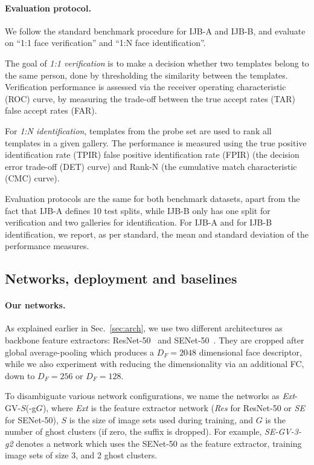 \documentclass[runningheads]{llncs}
\begin{document}
\paragraph{Evaluation protocol.}
We follow the standard benchmark procedure for
IJB-A and IJB-B, and evaluate on
``1:1 face verification'' and ``1:N face identification''.

The goal of \emph{1:1 verification} is to make a decision
whether two templates belong to the same person,
done by thresholding the similarity between the templates.
Verification performance is assessed via the
receiver operating characteristic (ROC) curve,
\ie by measuring the trade-off between the
true accept rates (TAR) \vs false accept 
rates (FAR).

For \emph{1:N identification},
templates from the probe set are used to rank
all templates in a given gallery. 
The performance is 
measured using the true positive identification 
rate (TPIR) \vs false positive identification 
rate (FPIR) (\ie the decision error trade-off (DET) curve)
and \vs Rank-N (\ie the cumulative match characteristic 
(CMC) curve).

Evaluation protocols are the same for both 
benchmark datasets, apart from the fact that
IJB-A defines 10 test splits,
while IJB-B only has one split for verification
and two galleries for identification.
For IJB-A and for IJB-B identification, we report,
as per standard, the mean and standard deviation of
the performance measures.




\subsection{Networks, deployment and baselines}

\paragraph{Our networks.}
As explained earlier in Sec.~\ref{sec:arch},
we use two different
architectures as backbone feature extractors:
ResNet-50~\cite{He16} 
and SENet-50~\cite{Hu18}.
They are cropped after global average-pooling
which produces a $D_F=2048$ dimensional face descriptor,
while we also experiment with reducing the dimensionality
via an additional FC, down to $D_F=256$ or $D_F=128$.

To disambiguate various network configurations,
we name the networks as \emph{Ext}-GV-$S$(-g$G$),
where \emph{Ext} is the feature extractor network
(\emph{Res} for ResNet-50 or \emph{SE} for SENet-50),
$S$ is the size of image sets used during training,
and $G$ is the number of ghost clusters (if zero,
the suffix is dropped).
For example, \emph{SE-GV-3-g2} denotes a network which uses
the SENet-50 as the feature extractor,
training image sets of size 3, and
2 ghost clusters.
\end{document}
